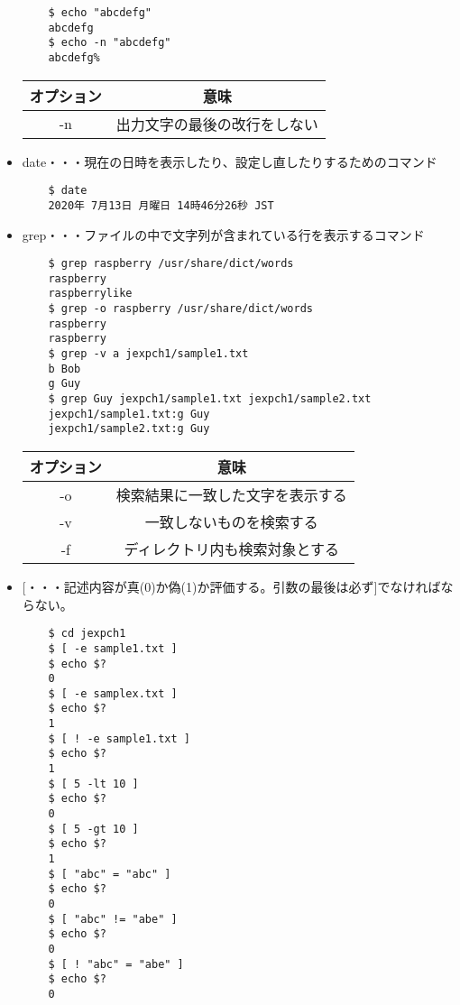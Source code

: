 \documentclass[a4paper,12pt]{jarticle}
\begin{document}
\begin{itemize}
          \begin{lstlisting}
    $ echo "abcdefg"
    abcdefg
    $ echo -n "abcdefg"
    abcdefg%
        \end{lstlisting}
          \begin{table}[h]
              \begin{center}
                  \begin{tabular}{|c|c|} \hline
                      オプション & 意味                         \\ \hline
                      -n         & 出力文字の最後の改行をしない \\ \hline
                  \end{tabular}
              \end{center}
          \end{table}
    \item date・・・現在の日時を表示したり、設定し直したりするためのコマンド
          \begin{lstlisting}
    $ date
    2020年 7月13日 月曜日 14時46分26秒 JST
            \end{lstlisting}
          \clearpage
    \item grep・・・ファイルの中で文字列が含まれている行を表示するコマンド
          \begin{lstlisting}
    $ grep raspberry /usr/share/dict/words
    raspberry
    raspberrylike
    $ grep -o raspberry /usr/share/dict/words
    raspberry
    raspberry
    $ grep -v a jexpch1/sample1.txt
    b Bob
    g Guy
    $ grep Guy jexpch1/sample1.txt jexpch1/sample2.txt
    jexpch1/sample1.txt:g Guy
    jexpch1/sample2.txt:g Guy
                \end{lstlisting}
          \begin{table}[h]
              \begin{center}
                  \begin{tabular}{|c|c|} \hline
                      オプション & 意味                             \\ \hline
                      -o         & 検索結果に一致した文字を表示する \\ \hline
                      -v         & 一致しないものを検索する         \\ \hline
                      -f         & ディレクトリ内も検索対象とする   \\ \hline
                  \end{tabular}
              \end{center}
          \end{table}
    \item $[$・・・記述内容が真(0)か偽(1)か評価する。引数の最後は必ず$]$でなければならない。
          \begin{lstlisting}
    $ cd jexpch1
    $ [ -e sample1.txt ]
    $ echo $?
    0
    $ [ -e samplex.txt ]
    $ echo $?
    1
    $ [ ! -e sample1.txt ]
    $ echo $?
    1
    $ [ 5 -lt 10 ]
    $ echo $?
    0
    $ [ 5 -gt 10 ]
    $ echo $?
    1
    $ [ "abc" = "abc" ]
    $ echo $?
    0
    $ [ "abc" != "abe" ]
    $ echo $?
    0
    $ [ ! "abc" = "abe" ]
    $ echo $?
    0
                    \end{lstlisting}


\end{itemize}
\end{document}
